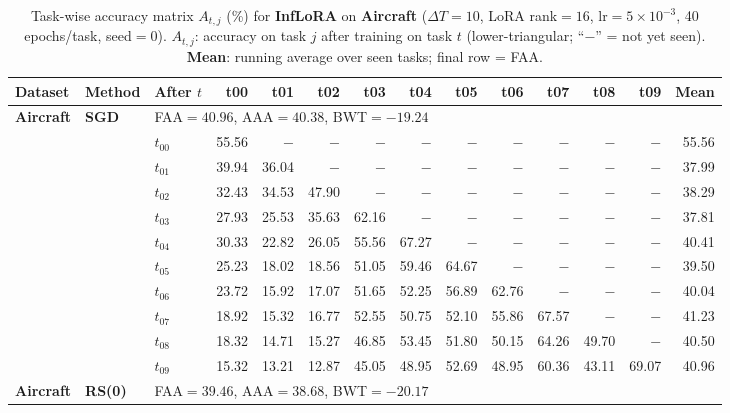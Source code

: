 \begin{table}[ht]
\centering
\caption{%
  Task-wise accuracy matrix $A_{t,j}$ (\%) for \textbf{InfLoRA} on \textbf{Aircraft} ($\Delta T=10$, LoRA rank$=16$, lr$=5\times10^{-3}$, 40 epochs/task, seed$=0$).
  $A_{t,j}$: accuracy on task $j$ after training on task $t$  (lower-triangular; ``$-$'' = not yet seen).
  \textbf{Mean}: running average over seen tasks; final row = FAA.
}
\label{tab:raw_inflora_aircraft}
\setlength{\tabcolsep}{2.8pt}
\renewcommand{\arraystretch}{0.88}
\scriptsize
\begin{tabular}{@{}l l l *{11}{r}@{}}
\toprule
\textbf{Dataset} & \textbf{Method} & \textbf{After $t$} & \textbf{t00} & \textbf{t01} & \textbf{t02} & \textbf{t03} & \textbf{t04} & \textbf{t05} & \textbf{t06} & \textbf{t07} & \textbf{t08} & \textbf{t09} & \textbf{Mean} \\
\midrule
\multirow{11}{*}{\textbf{Aircraft}} & \multirow{11}{*}{\textbf{SGD}} & \multicolumn{12}{l}{\quad\small FAA$=40.96$,\; AAA$=40.38$,\; BWT$=-19.24$} \\
 & & $t_{00}$ & 55.56 & $-$ & $-$ & $-$ & $-$ & $-$ & $-$ & $-$ & $-$ & $-$ & 55.56 \\
 & & $t_{01}$ & 39.94 & 36.04 & $-$ & $-$ & $-$ & $-$ & $-$ & $-$ & $-$ & $-$ & 37.99 \\
 & & $t_{02}$ & 32.43 & 34.53 & 47.90 & $-$ & $-$ & $-$ & $-$ & $-$ & $-$ & $-$ & 38.29 \\
 & & $t_{03}$ & 27.93 & 25.53 & 35.63 & 62.16 & $-$ & $-$ & $-$ & $-$ & $-$ & $-$ & 37.81 \\
 & & $t_{04}$ & 30.33 & 22.82 & 26.05 & 55.56 & 67.27 & $-$ & $-$ & $-$ & $-$ & $-$ & 40.41 \\
 & & $t_{05}$ & 25.23 & 18.02 & 18.56 & 51.05 & 59.46 & 64.67 & $-$ & $-$ & $-$ & $-$ & 39.50 \\
 & & $t_{06}$ & 23.72 & 15.92 & 17.07 & 51.65 & 52.25 & 56.89 & 62.76 & $-$ & $-$ & $-$ & 40.04 \\
 & & $t_{07}$ & 18.92 & 15.32 & 16.77 & 52.55 & 50.75 & 52.10 & 55.86 & 67.57 & $-$ & $-$ & 41.23 \\
 & & $t_{08}$ & 18.32 & 14.71 & 15.27 & 46.85 & 53.45 & 51.80 & 50.15 & 64.26 & 49.70 & $-$ & 40.50 \\
 & & $t_{09}$ & 15.32 & 13.21 & 12.87 & 45.05 & 48.95 & 52.69 & 48.95 & 60.36 & 43.11 & 69.07 & 40.96 \\
\midrule
\multirow{11}{*}{\textbf{Aircraft}} & \multirow{11}{*}{\textbf{RS(0)}} & \multicolumn{12}{l}{\quad\small FAA$=39.46$,\; AAA$=38.68$,\; BWT$=-20.17$} \\

\end{tabular}
\end{table}
